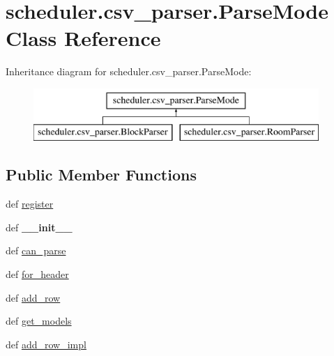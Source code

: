 \hypertarget{classscheduler_1_1csv__parser_1_1_parse_mode}{\section{scheduler.\-csv\-\_\-parser.\-Parse\-Mode Class Reference}
\label{classscheduler_1_1csv__parser_1_1_parse_mode}
}
Inheritance diagram for scheduler.\-csv\-\_\-parser.\-Parse\-Mode\-:\begin{figure}[H]
\begin{center}
\leavevmode
\includegraphics[height=2.000000cm]{classscheduler_1_1csv__parser_1_1_parse_mode}
\end{center}
\end{figure}
\subsection*{Public Member Functions}
\begin{DoxyCompactItemize}
\item 
def \hyperlink{classscheduler_1_1csv__parser_1_1_parse_mode_a3bc8ae2168d14c9f956528bf32023a3a}{register}
\item 
\hypertarget{classscheduler_1_1csv__parser_1_1_parse_mode_ad8e4121ce73986f2a07f939c666a2ad4}{def {\bfseries \-\_\-\-\_\-init\-\_\-\-\_\-}}\label{classscheduler_1_1csv__parser_1_1_parse_mode_ad8e4121ce73986f2a07f939c666a2ad4}

\item 
def \hyperlink{classscheduler_1_1csv__parser_1_1_parse_mode_a0feea2cd6393529d3606b348565bb58d}{can\-\_\-parse}
\item 
def \hyperlink{classscheduler_1_1csv__parser_1_1_parse_mode_a85b23beeadbaf1d1ed4046948928db9a}{for\-\_\-header}
\item 
def \hyperlink{classscheduler_1_1csv__parser_1_1_parse_mode_ab0e0daafe895143ae2c0042b1d77b1bb}{add\-\_\-row}
\item 
def \hyperlink{classscheduler_1_1csv__parser_1_1_parse_mode_af96a04e247153f76b58d7963b1721c4c}{get\-\_\-models}
\item 
def \hyperlink{classscheduler_1_1csv__parser_1_1_parse_mode_a4ee02dc3d582a3b222fe84db69731c91}{add\-\_\-row\-\_\-impl}
\end{DoxyCompactItemize}
